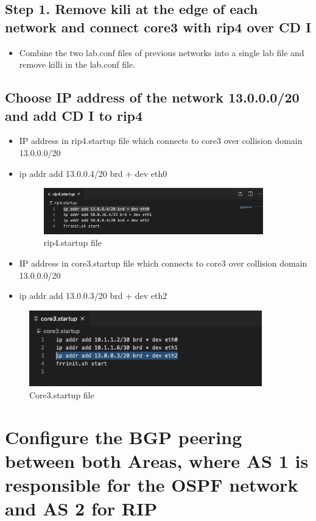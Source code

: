 \subsection{Step 1. Remove kili at the edge of each network and connect core3 with rip4 over CD I}
\begin{itemize}
\item Combine the two lab.conf files of previous networks into a single lab file and remove killi in the lab.conf file.
\end{itemize}
\subsection{ Choose IP address of the network 13.0.0.0/20 and add CD I to rip4}
\begin{itemize}
\item IP address in rip4.startup file which connects to core3 over collision domain 13.0.0.0/20
\item  ip addr add 13.0.0.4/20 brd + dev eth0
\begin{figure}[H]
\centering
  \includegraphics[width=0.9\textwidth]{Images/rip4.startup.png}
  \caption{rip4.startup file}
  \label{fig }
\end{figure}
\item IP address in core3.startup file which connects to core3 over collision domain 13.0.0.0/20
\item ip addr add 13.0.0.3/20 brd + dev eth2
\end{itemize}
\begin{figure}[H]
\centering
  \includegraphics[width=0.9\textwidth]{Images/core3.startup.png}
  \caption{Core3.startup file}
  \label{fig }
\end{figure}
\section{Configure the BGP peering between both Areas, where AS 1 is responsible for the OSPF network and AS 2 for RIP}
